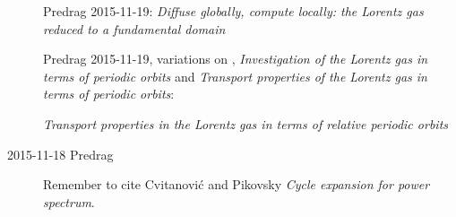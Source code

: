 \begin{description}
Predrag 2015-11-19: {\em Diffuse globally, compute locally:
            the {Lorentz} gas reduced to a fundamental domain}

Predrag 2015-11-19, variations on ,
{\em Investigation of the Lorentz gas in terms of periodic orbits}
and
{\em Transport properties of the {Lorentz} gas
           in terms of periodic orbits}:

{\em Transport properties in the {Lorentz} gas
           in terms of relative periodic orbits}

\item[2015-11-18 Predrag]
Remember to cite Cvitanovi\'c and
    Pikovsky {\em Cycle expansion for power spectrum}.

\end{description}
